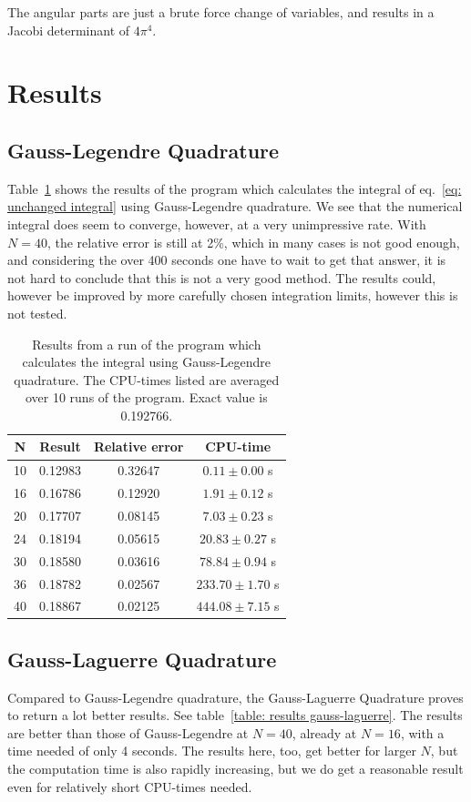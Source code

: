 \documentclass[twoside, 11pt]{article}
\begin{document}
		 The angular parts are just a brute force change of variables, and results in a Jacobi determinant of $4\pi^4$.
			
			
\section{Results}
	\subsection{Gauss-Legendre Quadrature}
		Table~\ref{table: results gauss-legendre} shows the results of the program which calculates the integral of eq.~\eqref{eq: unchanged integral} using Gauss-Legendre quadrature. We see that the numerical integral does seem to converge, however, at a very unimpressive rate. With $N=40$, the relative error is still at 2\%, which in many cases is not good enough, and considering the over 400 seconds one have to wait to get that answer, it is not hard to conclude that this is not a very good method. The results could, however be improved by more carefully chosen integration limits, however this is not tested.
		\begin{table}[h]
			\centering
			\caption{Results from a run of the program which calculates the integral using Gauss-Legendre quadrature. The CPU-times listed are averaged over 10 runs of the program. Exact value is 0.192766.}
			\label{table: results gauss-legendre}
			\begin{tabular}{|c|c|c|c|}
\hline
\textbf{N} 	&	\textbf{Result}	&	\textbf{Relative error}	&	\textbf{CPU-time} \\ \hline 
10 	&	0.12983	&	0.32647			&	$0.11 \pm 0.00$ s	\\ \hline
16 	&	0.16786	&	0.12920			&	$1.91 \pm 0.12$ s	\\ \hline
20 	&	0.17707	&	0.08145			&	$7.03 \pm 0.23$ s	\\ \hline
24 	&	0.18194	&	0.05615			&	$20.83 \pm 0.27$ s	\\ \hline
30 	&	0.18580	&	0.03616			&	$78.84 \pm 0.94$ s	\\ \hline
36 	&	0.18782	&	0.02567			&	$233.70 \pm 1.70$ s	\\ \hline
40 	&	0.18867	&	0.02125			&	$444.08 \pm 7.15$ s	\\ \hline			
			\end{tabular}
		\end{table}
	
	
	\subsection{Gauss-Laguerre Quadrature}
		Compared to Gauss-Legendre quadrature, the Gauss-Laguerre Quadrature proves to return a lot better results. See table~\ref{table: results gauss-laguerre}. The results are better than those of Gauss-Legendre at $N=40$, already at $N=16$, with a time needed of only 4 seconds. The results here, too, get better for larger $N$, but the computation time is also rapidly increasing, but we do get a reasonable result even for relatively short CPU-times needed.
		
\end{document}
